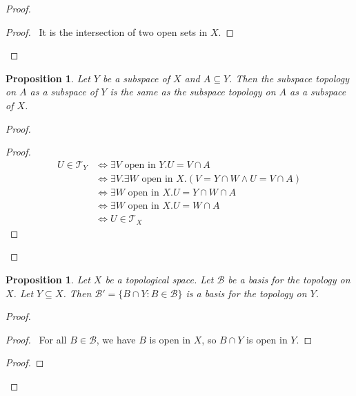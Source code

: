 \documentclass{book}
\let\qed\relax
\newtheorem{prop}[ax]{Proposition}
\theoremstyle{definition}
\begin{document}
\begin{proof}
\pf
{}
\begin{proof}
	\pf\ It is the intersection of two open sets in $X$.
\end{proof}
\qed
\end{proof}

\begin{prop}
Let $Y$ be a subspace of $X$ and $A \subseteq Y$. Then the subspace topology on $A$ as a subspace of $Y$ is the same as the subspace topology on $A$ as a subspace of $X$.
\end{prop}

\begin{proof}
\pf
{}
\begin{proof}
	\pf
	\begin{align*}
		U \in \mathcal{T}_Y & \Leftrightarrow \exists V \text{ open in } Y. U = V \cap A \\
		& \Leftrightarrow \exists V. \exists W \text{ open in } X. (V = Y \cap W \wedge U = V \cap A) \\
		& \Leftrightarrow \exists W \text{ open in } X. U = Y \cap W \cap A \\
		& \Leftrightarrow \exists W \text{ open in } X. U = W \cap A \\
		& \Leftrightarrow U \in \mathcal{T}_X
	\end{align*}
\end{proof}
\qed
\end{proof}

\begin{prop}
Let $X$ be a topological space. Let $\mathcal{B}$ be a basis for the topology on $X$. Let $Y \subseteq X$. Then $\mathcal{B}' = \{ B \cap Y : B \in \mathcal{B} \}$ is a basis for the topology on $Y$.
\end{prop}

\begin{proof}
\pf
{}
\begin{proof}
	\pf\ For all $B \in \mathcal{B}$, we have $B$ is open in $X$, so $B \cap Y$ is open in $Y$.
\end{proof}
\begin{proof}
\end{proof}
\qed
\end{proof}
\end{document}
